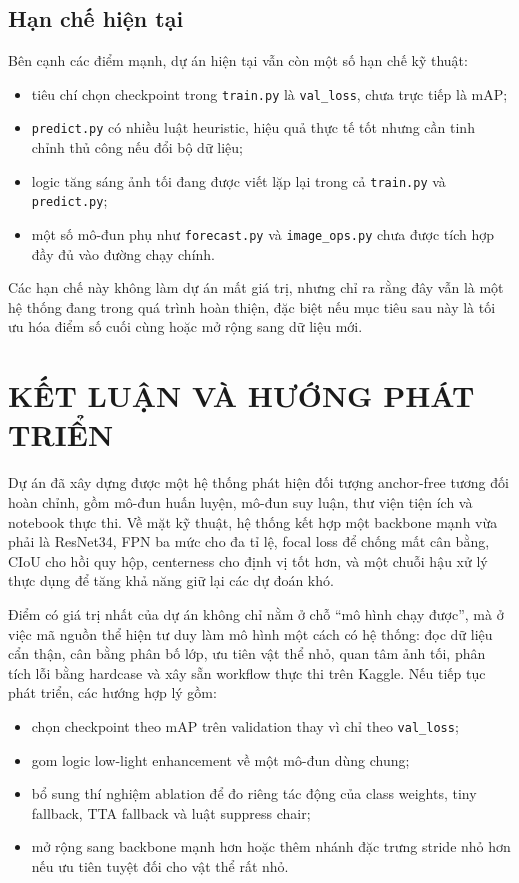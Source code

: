 \documentclass[12pt,a4paper]{article}
\begin{document}
\subsection{Hạn chế hiện tại}
Bên cạnh các điểm mạnh, dự án hiện tại vẫn còn một số hạn chế kỹ thuật:
\begin{itemize}
    \item tiêu chí chọn checkpoint trong \texttt{train.py} là \texttt{val\_loss}, chưa trực tiếp là mAP;
    \item \texttt{predict.py} có nhiều luật heuristic, hiệu quả thực tế tốt nhưng cần tinh chỉnh thủ công nếu đổi bộ dữ liệu;
    \item logic tăng sáng ảnh tối đang được viết lặp lại trong cả \texttt{train.py} và \texttt{predict.py};
    \item một số mô-đun phụ như \texttt{forecast.py} và \texttt{image\_ops.py} chưa được tích hợp đầy đủ vào đường chạy chính.
\end{itemize}

Các hạn chế này không làm dự án mất giá trị, nhưng chỉ ra rằng đây vẫn là một hệ thống đang trong quá trình hoàn thiện, đặc biệt nếu mục tiêu sau này là tối ưu hóa điểm số cuối cùng hoặc mở rộng sang dữ liệu mới.

\section{KẾT LUẬN VÀ HƯỚNG PHÁT TRIỂN}
Dự án đã xây dựng được một hệ thống phát hiện đối tượng anchor-free tương đối hoàn chỉnh, gồm mô-đun huấn luyện, mô-đun suy luận, thư viện tiện ích và notebook thực thi. Về mặt kỹ thuật, hệ thống kết hợp một backbone mạnh vừa phải là ResNet34, FPN ba mức cho đa tỉ lệ, focal loss để chống mất cân bằng, CIoU cho hồi quy hộp, centerness cho định vị tốt hơn, và một chuỗi hậu xử lý thực dụng để tăng khả năng giữ lại các dự đoán khó.

Điểm có giá trị nhất của dự án không chỉ nằm ở chỗ ``mô hình chạy được'', mà ở việc mã nguồn thể hiện tư duy làm mô hình một cách có hệ thống: đọc dữ liệu cẩn thận, cân bằng phân bố lớp, ưu tiên vật thể nhỏ, quan tâm ảnh tối, phân tích lỗi bằng hardcase và xây sẵn workflow thực thi trên Kaggle. Nếu tiếp tục phát triển, các hướng hợp lý gồm:
\begin{itemize}
    \item chọn checkpoint theo mAP trên validation thay vì chỉ theo \texttt{val\_loss};
    \item gom logic low-light enhancement về một mô-đun dùng chung;
    \item bổ sung thí nghiệm ablation để đo riêng tác động của class weights, tiny fallback, TTA fallback và luật suppress chair;
    \item mở rộng sang backbone mạnh hơn hoặc thêm nhánh đặc trưng stride nhỏ hơn nếu ưu tiên tuyệt đối cho vật thể rất nhỏ.
\end{itemize}
\end{document}
